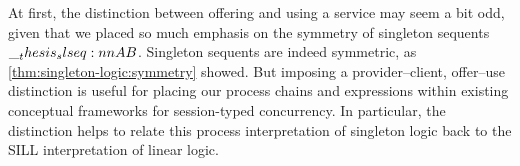 





At first, the distinction between offering and using a service may seem a bit odd, given that we placed so much emphasis on the symmetry of singleton sequents $\slseq{A |- B}$.
Singleton sequents are indeed symmetric, as \cref{thm:singleton-logic:symmetry} showed.
But imposing a provider--client, offer--use distinction is useful for placing our process chains and expressions within existing conceptual frameworks for session-typed concurrency.
In particular, the distinction helps to relate this process interpretation of singleton logic back to the \ac{SILL} interpretation of linear logic\autocites{Caires+Pfenning:CONCUR10}{Caires+:TLDI12}{Caires+:MSCS16}{Toninho+:ESOP13}.




